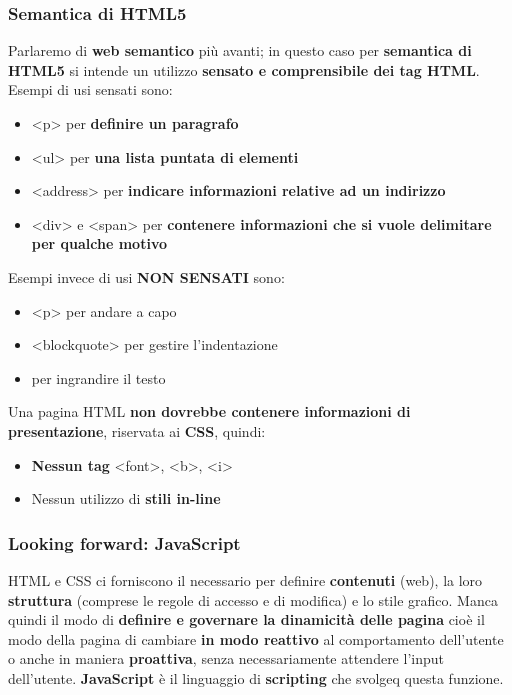 \documentclass[12pt]{article}
\begin{document}
\subsubsection{Semantica di HTML5}
Parlaremo di \textbf{web semantico} più avanti; in questo caso per \textbf{semantica di HTML5} si intende un utilizzo \textbf{sensato e comprensibile dei tag HTML}.
Esempi di usi sensati sono:
\begin{itemize}
    \item <p> per \textbf{definire un paragrafo}
    \item <ul> per \textbf{una lista puntata di elementi}
    \item <address> per \textbf{indicare informazioni relative ad un indirizzo}
    \item <div> e <span> per \textbf{contenere informazioni che si vuole delimitare per qualche motivo}
\end{itemize}
Esempi invece di usi \textbf{NON SENSATI} sono:
\begin{itemize}
    \item <p> per andare a capo
    \item <blockquote> per gestire l'indentazione
    \item <h1> per ingrandire il testo
\end{itemize}
Una pagina HTML \textbf{non dovrebbe contenere informazioni di presentazione}, riservata ai \textbf{CSS}, quindi:
\begin{itemize}
    \item \textbf{Nessun tag} <font>, <b>, <i>
    \item Nessun utilizzo di \textbf{stili in-line}
\end{itemize}
\subsubsection{Looking forward: JavaScript}
HTML  e CSS ci forniscono il necessario per definire \textbf{contenuti} (web), la loro \textbf{struttura} (comprese le regole di accesso e di modifica) e lo stile grafico.
Manca quindi il modo di \textbf{definire e governare la dinamicità delle pagina} cioè il modo della pagina di cambiare \textbf{in modo reattivo} al comportamento dell'utente o anche in maniera \textbf{proattiva}, senza
necessariamente attendere l'input dell'utente. \textbf{JavaScript} è il linguaggio di \textbf{scripting} che svolgeq questa funzione.
\end{document}
